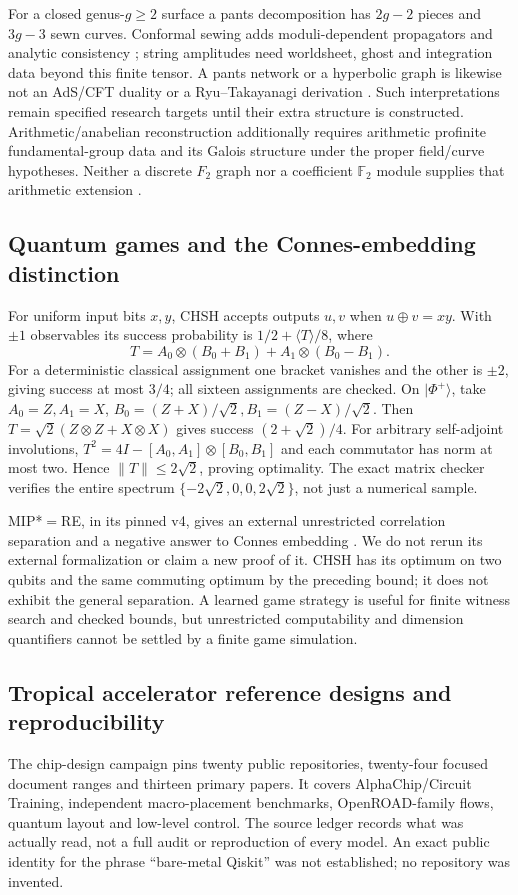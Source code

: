 \documentclass[11pt]{article}
\theoremstyle{definition}\newtheorem{definition}[theorem]{Definition}
\theoremstyle{remark}\newtheorem{remark}[theorem]{Remark}
\begin{document}
For a closed genus-$g\geq2$ surface a pants decomposition has $2g-2$
pieces and $3g-3$ sewn curves. Conformal sewing adds moduli-dependent
propagators and analytic consistency \cite{LFSegal}; string amplitudes
need worldsheet, ghost and integration data beyond this finite tensor.
A pants network or a hyperbolic graph is likewise not an AdS/CFT duality
or a Ryu--Takayanagi derivation \cite{LFRyu}. Such interpretations remain
specified research targets until their extra structure is constructed.
Arithmetic/anabelian reconstruction additionally requires arithmetic
profinite fundamental-group data and its Galois structure under the proper
field/curve hypotheses. Neither a discrete $F_2$ graph nor a coefficient
$\mathbb F_2$ module supplies that arithmetic extension \cite{LFAnabelian}.

\subsection{Quantum games and the Connes-embedding distinction}
For uniform input bits $x,y$, CHSH accepts outputs $u,v$ when
$u\oplus v=xy$. With $\pm1$ observables its success probability is
$1/2+\langle T\rangle/8$, where
\[
 T=A_0\otimes(B_0+B_1)+A_1\otimes(B_0-B_1).
\]
For a deterministic classical assignment one bracket vanishes and the
other is $\pm2$, giving success at most $3/4$; all sixteen assignments
are checked. On $|\Phi^+\rangle$, take $A_0=Z,A_1=X$,
$B_0=(Z+X)/\sqrt2,B_1=(Z-X)/\sqrt2$. Then
$T=\sqrt2(Z\otimes Z+X\otimes X)$ gives success
$(2+\sqrt2)/4$. For arbitrary self-adjoint involutions,
$T^2=4I-[A_0,A_1]\otimes[B_0,B_1]$ and each commutator has norm at most
two. Hence $\|T\|\leq2\sqrt2$, proving optimality.
The exact matrix checker verifies the entire spectrum
$\{-2\sqrt2,0,0,2\sqrt2\}$, not just a numerical sample.

MIP*$=$RE, in its pinned v4, gives an external unrestricted correlation
separation and a negative answer to Connes embedding \cite{LFMIP}.
We do not rerun its external formalization or claim a new proof of it.
CHSH has its optimum on two qubits and the same commuting optimum by
the preceding bound; it does not exhibit the general separation.
A learned game strategy is useful for finite witness search and checked
bounds, but unrestricted computability and dimension quantifiers cannot
be settled by a finite game simulation.

\subsection{Tropical accelerator reference designs and reproducibility}
The chip-design campaign pins twenty public repositories, twenty-four
focused document ranges and thirteen primary papers. It covers
AlphaChip/Circuit Training, independent macro-placement benchmarks,
OpenROAD-family flows, quantum layout and low-level control.
The source ledger records what was actually read, not a full audit or
reproduction of every model. An exact public identity for the phrase
``bare-metal Qiskit'' was not established; no repository was invented.
\end{document}
